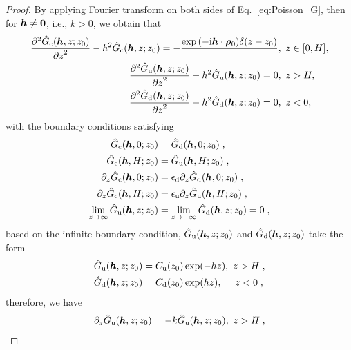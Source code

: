 \begin{proof}
    By applying Fourier transform on both sides of Eq.~\eqref{eq:Poisson_G}, then for $\boldsymbol{h}\neq \bm{0}$, i.e., $k>0$, we obtain that
    \begin{equation*} 
        \begin{split}
            \frac{\partial^2 \Hat{G}_{\mathrm{c}}(\boldsymbol{h}, z; z_0)}{{\partial z}^2} - h^2 \Hat{G}_{\mathrm{c}}(\boldsymbol{h}, z; z_0) = - \frac{ \exp{(-\mathrm{i} \boldsymbol{h} \cdot \boldsymbol{\rho}_0)}\delta (z- z_0)}{ }&,~z \in [0, H],\\
            \frac{\partial^2 \hat{G}_{\mathrm{u}}(\boldsymbol{h}, z; z_0)}{{\partial z}^2} - h^2 \hat{G}_{\mathrm{u}}(\boldsymbol{h}, z; z_0) = 0&,~z > H,\\
            \frac{\partial^2 \hat{G}_{\mathrm{d}}(\boldsymbol{h}, z; z_0)}{{\partial z}^2} - h^2 \hat{G}_{\mathrm{d}}(\boldsymbol{h}, z; z_0) = 0&,~z < 0,
        \end{split}
    \end{equation*}
    with the boundary conditions satisfying    
    \begin{equation*}
        \begin{split}
            \Hat{G}_{\mathrm{c}}(\boldsymbol{h}, 0; z_0) &= \Hat{G}_{\mathrm{d}}(\boldsymbol{h}, 0; z_0)\;,\\
            \hat{G}_{\mathrm{c}}(\boldsymbol{h}, H; z_0) &= \hat{G}_{\mathrm{u}}(\boldsymbol{h}, H; z_0)\;,\\
              \partial_z\Hat{G}_{\mathrm{c}}(\boldsymbol{h}, 0; z_0) &= \epsilon_{\mathrm{d}} \partial_z\Hat{G}_{\mathrm{d}}(\boldsymbol{h}, 0; z_0)\;,\\
              \partial_z\Hat{G}_{\mathrm{c}}(\boldsymbol{h}, H; z_0) &= \epsilon_{\mathrm{u}} \partial_z\Hat{G}_{\mathrm{u}}(\boldsymbol{h}, H; z_0)\;,\\
            \lim_{z \to \infty} \Hat{G}_{\mathrm{u}}(\boldsymbol{h}, z; z_0) &= \lim_{z \to -\infty}\Hat{G}_{\mathrm{d}}(\boldsymbol{h}, z; z_0)  = 0\;,
        \end{split}
    \end{equation*}
based on the infinite boundary condition,  $\Hat{G}_{\mathrm{u}}(\boldsymbol{h}, z; z_0)$ and $\Hat{G}_{\mathrm{d}}(\boldsymbol{h}, z; z_0)$ take the form
\begin{align*}
    \Hat{G}_{\mathrm{u}}(\boldsymbol{h}, z; z_0)&=C_{\mathrm{u}}(z_0)\exp(- h z),~z > H\;,\\
     \Hat{G}_{\mathrm{d}}(\boldsymbol{h}, z; z_0)&=C_{\mathrm{d}}(z_0)\exp(h z),~~~~z < 0\;,
\end{align*}
therefore, we have 
\begin{align*}
    \partial_z\Hat{G}_{\mrm{u}}(\V{h}, z; z_0)&=-k\Hat{G}_{\mrm{u}}(\V{h}, z; z_0),~z > H\;,\\

\end{align*}
\end{proof}
